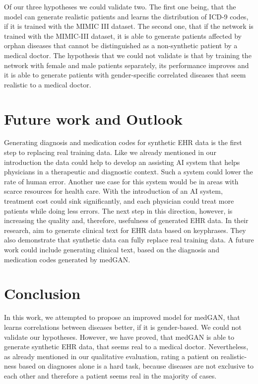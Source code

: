 \documentclass[11pt, a4paper, oneside]{book}
\begin{document}
Of our three hypotheses we could validate two. The first one being, that the model can generate realistic patients and learns the distribution of ICD-9 codes, if it is trained with the MIMIC III dataset. The second one, that if the network is trained with the MIMIC-III dataset, it is able to generate patients affected by orphan diseases that cannot be distinguished as a non-synthetic patient by a medical doctor.
The hypothesis that we could not validate is that by training the network with female and male patients separately, its performance improves and it is able to generate patients with gender-specific correlated diseases that seem realistic to a medical doctor.

\section{Future work and Outlook}
Generating diagnosis and medication codes for synthetic EHR data is the first step to replacing real training data. Like we already mentioned in our introduction the data could help to develop an assisting AI system that helps physicians in a therapeutic and diagnostic context. Such a system could lower the rate of human error. Another use case for this system would be in areas with scarce resources for health care. With the introduction of an AI system, treatment cost could sink significantly, and each physician could treat more patients while doing less errors. The next step in this direction, however, is increasing the quality and, therefore, usefulness of generated EHR data. In their research, \citep{wang} aim to generate clinical text for EHR data based on keyphrases. They also demonstrate that synthetic data can fully replace real training data. A future work could include generating clinical text, based on the diagnosis and medication codes generated by medGAN.

\section{Conclusion}
In this work, we attempted to propose an improved model for medGAN, that learns correlations between diseases better, if it is gender-based. We could not validate our hypotheses. However, we have proved, that medGAN is able to generate synthetic EHR data, that seems real to a medical doctor. Nevertheless, as already mentioned in our qualitative evaluation, rating a patient on realistic-ness based on diagnoses alone is a hard task, because diseases are not exclusive to each other and therefore a patient seems real in the majority of cases.
\end{document}

